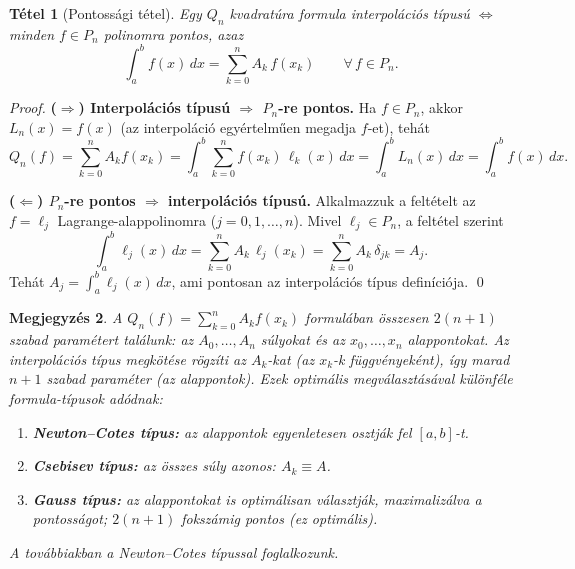 \documentclass[a4paper,12pt]{article}
\theoremstyle{mydef}
\newtheorem{tetel}{Tétel}[section]
\newtheorem{megjegyzes}[tetel]{Megjegyzés}
\begin{document}
\begin{mdframed}[backgroundcolor=thmbg,linewidth=0pt,innertopmargin=8pt,innerbottommargin=8pt]
\begin{tetel}[Pontossági tétel]
\label{tetel:pontossagi}
Egy $Q_n$ kvadratúra formula interpolációs típusú $\Longleftrightarrow$ minden
$f \in P_n$ polinomra pontos, azaz
\[
  \int_a^b f(x)\,dx = \sum_{k=0}^n A_k\,f(x_k) \qquad \forall\,f \in P_n.
\]
\end{tetel}
\end{mdframed}

\begin{proof}
\textbf{($\Rightarrow$) Interpolációs típusú $\Rightarrow$ $P_n$-re pontos.}
Ha $f \in P_n$, akkor $L_n(x) = f(x)$ (az interpoláció egyértelműen megadja $f$-et), tehát
\[
  Q_n(f) = \sum_{k=0}^n A_k f(x_k) = \int_a^b \sum_{k=0}^n f(x_k)\,\ell_k(x)\,dx
  = \int_a^b L_n(x)\,dx = \int_a^b f(x)\,dx.
\]

\textbf{($\Leftarrow$) $P_n$-re pontos $\Rightarrow$ interpolációs típusú.}
Alkalmazzuk a feltételt az $f = \ell_j$ Lagrange-alappolinomra ($j = 0, 1, \ldots, n$).
Mivel $\ell_j \in P_n$, a feltétel szerint
\[
  \int_a^b \ell_j(x)\,dx = \sum_{k=0}^n A_k\,\ell_j(x_k) = \sum_{k=0}^n A_k\,\delta_{jk} = A_j.
\]
Tehát $A_j = \int_a^b \ell_j(x)\,dx$, ami pontosan az interpolációs típus definíciója. \qed
\end{proof}

\begin{megjegyzes}
A $Q_n(f) = \sum_{k=0}^n A_k f(x_k)$ formulában összesen $2(n+1)$ szabad paramétert
találunk: az $A_0, \ldots, A_n$ súlyokat és az $x_0, \ldots, x_n$ alappontokat.
Az interpolációs típus megkötése rögzíti az $A_k$-kat (az $x_k$-k függvényeként), így
marad $n+1$ szabad paraméter (az alappontok). Ezek optimális megválasztásával
különféle formula-típusok adódnak:

\begin{enumerate}[noitemsep,topsep=2pt]
  \item \textbf{Newton--Cotes típus:} az alappontok egyenletesen osztják fel $[a,b]$-t.
  \item \textbf{Csebisev típus:} az összes súly azonos: $A_k \equiv A$.
  \item \textbf{Gauss típus:} az alappontokat is optimálisan választják, maximalizálva a
        pontosságot; $2(n+1)$ fokszámig pontos (ez optimális).
\end{enumerate}
A továbbiakban a Newton--Cotes típussal foglalkozunk.
\end{megjegyzes}
\end{document}
